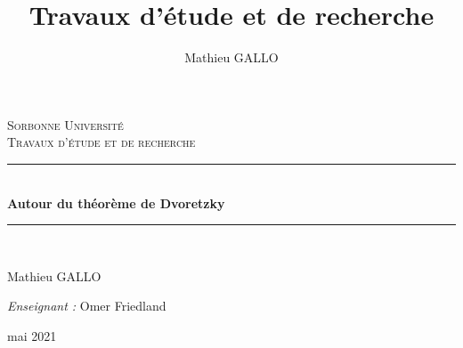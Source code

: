 \documentclass[12pt]{article}
\author{Mathieu GALLO}
\title{Travaux d'étude et de recherche}
\theoremstyle{definition}
\newcommand{\HRule}{\rule{\linewidth}{0.5mm}}
\begin{document}
\begin{titlepage}
	\begin{center}
		
		\textsc{\LARGE Sorbonne Université}\\[2cm]
		
		\textsc{\Large Travaux d'étude et de recherche}\\[1.5cm]
		

		\HRule \\[0.4cm]
		{ \huge \bfseries Autour du théorème de Dvoretzky\\[0.4cm] }
		

		\HRule \\[2cm]

		\begin{minipage}{\textwidth}
			\begin{center} 
				Mathieu GALLO \\
			\end{center}
		\end{minipage}
		\vfill
		\begin{minipage}{0.4\textwidth}
			\begin{center} 
				\emph{Enseignant :} Omer Friedland\\
			\end{center}
		\end{minipage}
		
		\vspace{5mm}		
		{mai 2021}
		
	\end{center}
\end{titlepage}
\tableofcontents\newpage
\end{document}

